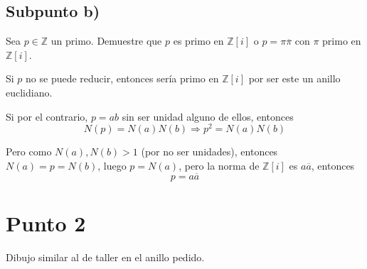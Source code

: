 \documentclass{article}
\begin{document}
    \subsection{Subpunto b)}
      Sea $p \in \mathbb{Z}$ un primo. Demuestre que $p$ es primo en $\mathbb{Z}[i]$ o 
      $p = \pi \overline{\pi}$ con $\pi$ primo en $\mathbb{Z}[i]$.

      Si $p$ no se puede reducir, entonces sería primo en $\mathbb{Z}[i]$ por ser este un anillo euclidiano.


      Si por el contrario, $p = ab$ sin ser unidad alguno de ellos, entonces 
      \[
        N(p) = N(a)N(b) \Rightarrow p^2 = N(a)N(b)
      \]

      Pero como $N(a), N(b) > 1$ (por no ser unidades), entonces $N(a) = p = N(b)$, luego 
      $p = N(a)$, pero la norma de $\mathbb{Z}[i]$ es $a \overline{a}$, entonces 
      \[
        p = a \overline{a}
      \]


  
  \section{Punto 2}

    Dibujo similar al de taller en el anillo pedido.
\end{document}

